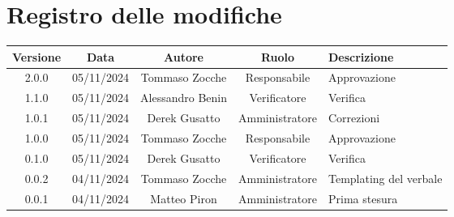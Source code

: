 
\section*{Registro delle modifiche}
\begin{table}[H]
    \begin{tabular}{|c|c|c|c|p{3cm}|}
        \hline
         \textbf{Versione} &  \textbf{Data} &  \textbf{Autore} &  \textbf{Ruolo} & \textbf{Descrizione} \\
         \hline
          2.0.0 & 05/11/2024 & Tommaso Zocche & Responsabile & Approvazione \\
         \hline
          1.1.0 & 05/11/2024 & Alessandro Benin & Verificatore & Verifica \\
         \hline
          1.0.1 & 05/11/2024 & Derek Gusatto & Amministratore & Correzioni \\
          \hline
          1.0.0 & 05/11/2024 & Tommaso Zocche & Responsabile & Approvazione \\
          \hline
          0.1.0 & 05/11/2024 & Derek Gusatto & Verificatore & Verifica \\
          \hline
          0.0.2 & 04/11/2024 & Tommaso Zocche & Amministratore & Templating del verbale \\
          \hline
          0.0.1 & 04/11/2024 & Matteo Piron & Amministratore & Prima stesura \\
          \hline
    \end{tabular}
\end{table}